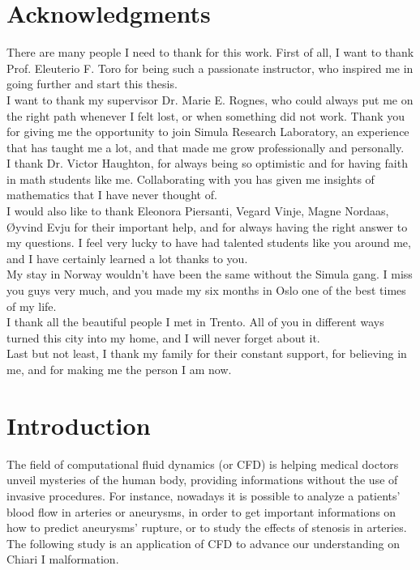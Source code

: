 \documentclass[a4paper,11pt,openright,twoside]{book}
\begin{document}
\chapter*{\LARGE Acknowledgments}
There are many people I need to thank for this work. First of all, I want to thank Prof. Eleuterio F. Toro for being such a passionate instructor, who inspired me in going further and start this thesis. \\
I want to thank my supervisor Dr. Marie E. Rognes, who could always put me on the right path whenever I felt lost, or when something did not work. Thank you for giving me the opportunity to join Simula Research Laboratory, an experience that has taught me a lot, and that made me grow professionally and personally. \\
I thank Dr. Victor Haughton, for always being so optimistic and for having faith in math students like me. Collaborating with you has given me insights of mathematics that I have never thought of. \\

I would also like to thank Eleonora Piersanti, Vegard Vinje, Magne Nordaas, Øyvind Evju for their important help, and for always having the right answer to my questions. I feel very lucky to have had talented students like you around me, and I have certainly learned a lot thanks to you. \\

My stay in Norway  wouldn't have been the same without the Simula gang. I miss you guys very much, and you made my six months in Oslo one of the best times of my life. \\
I thank all the beautiful people I met in Trento. All of you in different ways turned this city into my home, and I will never forget about it. \\
Last but not least, I thank my family for their constant support, for believing in me, and for making me the person I am now.

\newpage




\newpage
\tableofcontents


\newpage
{}

\chapter{Introduction}
The field of computational fluid dynamics (or CFD) is helping medical doctors unveil mysteries of the human body, providing informations without the use of invasive procedures. For instance, nowadays it is possible to analyze a patients' blood flow in arteries or aneurysms, in order to get important informations on how to predict  aneurysms' rupture, or to study the effects of stenosis in arteries. The following study is an application of CFD to advance our understanding on Chiari I malformation.
\end{document}
